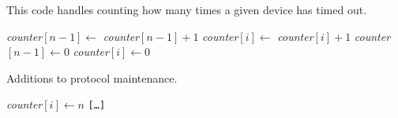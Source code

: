 \begin{algorithm}[h]
\caption{This code handles counting how many times a given device has timed out.}
\label{lst:general_case3}
\begin{algorithmic}[1]
            \State \textit{counter}$[n - 1] \gets$ \textit{counter}$[n - 1] + 1$
            \State \textit{counter}$[i] \gets$ \textit{counter}$[i] + 1$
        \EndIf
    \Else
            \State \textit{counter}$[n - 1] \gets 0$
            \State \textit{counter}$[i] \gets 0$
        \EndIf
    \EndIf
\EndProcedure
\end{algorithmic}    
\end{algorithm}

\begin{algorithm}[h]
\caption{Additions to protocol maintenance.}
\label{lst:maintaniance1}
\begin{algorithmic}[1]
                \State \textit{counter}$[i] \gets n$
            \EndFor
        \EndIf
    \EndIf
\Statex \texttt{[\ldots]}
\EndProcedure
\end{algorithmic}    
\end{algorithm}
 